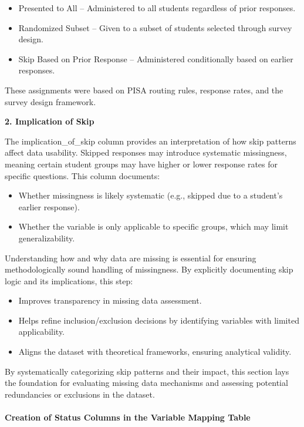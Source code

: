 \documentclass[
]{article}
\begin{document}
\begin{itemize}
\item
  Presented to All -- Administered to all students regardless of prior
  responses.
\item
  Randomized Subset -- Given to a subset of students selected through
  survey design.
\item
  Skip Based on Prior Response -- Administered conditionally based on
  earlier responses.
\end{itemize}

These assignments were based on PISA routing rules, response rates, and
the survey design framework.

\textbf{2. Implication of Skip}

The implication\_of\_skip column provides an interpretation of how skip
patterns affect data usability. Skipped responses may introduce
systematic missingness, meaning certain student groups may have higher
or lower response rates for specific questions. This column documents:

\begin{itemize}
\item
  Whether missingness is likely systematic (e.g., skipped due to a
  student's earlier response).
\item
  Whether the variable is only applicable to specific groups, which may
  limit generalizability.
\end{itemize}

Understanding how and why data are missing is essential for ensuring
methodologically sound handling of missingness. By explicitly
documenting skip logic and its implications, this step:

\begin{itemize}
\item
  Improves transparency in missing data assessment.
\item
  Helps refine inclusion/exclusion decisions by identifying variables
  with limited applicability.
\item
  Aligns the dataset with theoretical frameworks, ensuring analytical
  validity.
\end{itemize}

By systematically categorizing skip patterns and their impact, this
section lays the foundation for evaluating missing data mechanisms and
assessing potential redundancies or exclusions in the dataset.

\hypertarget{creation-of-status-columns-in-the-variable-mapping-table}{%
\paragraph{Creation of Status Columns in the Variable Mapping
Table}\label{creation-of-status-columns-in-the-variable-mapping-table}}
\end{document}
